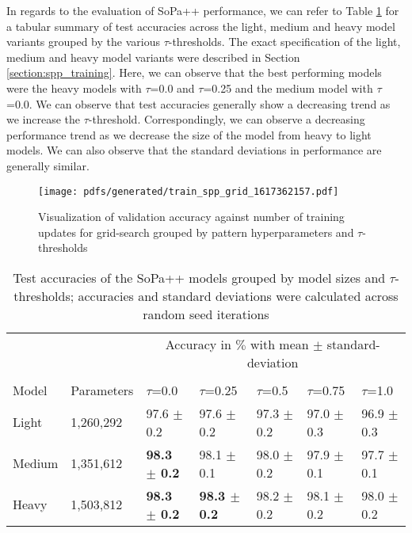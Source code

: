 In regards to the evaluation of SoPa++ performance, we can refer to Table
\ref{tab:results_evaluation} for a tabular summary of test accuracies across the
light, medium and heavy model variants grouped by the various $\tau$-thresholds.
The exact specification of the light, medium and heavy model variants were
described in Section \ref{section:spp_training}. Here, we can observe that the
best performing models were the heavy models with $\tau$=0.0 and $\tau$=0.25
and the medium model with $\tau$=0.0. We can observe that test accuracies
generally show a decreasing trend as we increase the $\tau$-threshold.
Correspondingly, we can observe a decreasing performance trend as we decrease
the size of the model from heavy to light models. We can also observe that the
standard deviations in performance are generally similar.

\begin{figure}[t!]
  \centering
  \texttt{[image: pdfs/generated/train\_spp\_grid\_1617362157.pdf]}
  \caption{Visualization of validation accuracy against number of training
    updates for grid-search grouped by pattern hyperparameters and $\tau$-thresholds}
  \label{fig:results_training}
\end{figure}

\begin{table}[t!]
  \centering {}
  \small
  \begin{tabular}{lllllll}
    \toprule
    && \multicolumn{5}{c}{Accuracy in $\%$ with mean $\pm$ standard-deviation} \\
    \cline{3-7} \\[-10pt]
    Model & Parameters & $\tau$=0.0 & $\tau$=0.25 & $\tau$=0.5 & $\tau$=0.75 & $\tau$=1.0 \\
    \midrule
    Light & 1,260,292 & 97.6 $\pm$ 0.2 & 97.6 $\pm$ 0.2 & 97.3 $\pm$ 0.2 & 97.0 $\pm$ 0.3 & 96.9 $\pm$ 0.3 \\
    Medium & 1,351,612 & \textbf{98.3 $\bm{\pm}$ 0.2} & 98.1 $\pm$ 0.1 & 98.0 $\pm$ 0.2 & 97.9 $\pm$ 0.1 & 97.7 $\pm$ 0.1  \\
    Heavy & 1,503,812 & \textbf{98.3 $\bm{\pm}$ 0.2} & \textbf{98.3 $\bm{\pm}$ 0.2} & 98.2 $\pm$ 0.2 & 98.1 $\pm$ 0.2 & 98.0 $\pm$ 0.2 \\
    \bottomrule
  \end{tabular}
  \caption{Test accuracies of the SoPa++ models grouped by model sizes and
    $\tau$-thresholds; accuracies and standard deviations were calculated across
  random seed iterations}
  \label{tab:results_evaluation}
\end{table}

